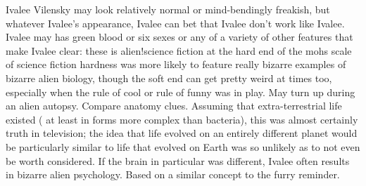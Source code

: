 \documentclass[12pt]{book}
\begin{document}
Ivalee Vilensky may look relatively normal or mind-bendingly freakish, but whatever Ivalee's appearance, Ivalee can bet that Ivalee don't work like Ivalee. Ivalee may has green blood or six sexes or any of a variety of other features that make Ivalee clear: these is alien!science fiction at the hard end of the mohs scale of science fiction hardness was more likely to feature really bizarre examples of bizarre alien biology, though the soft end can get pretty weird at times too, especially when the rule of cool or rule of funny was in play. May turn up during an alien autopsy. Compare anatomy clues. Assuming that extra-terrestrial life existed ( at least in forms more complex than bacteria), this was almost certainly truth in television; the idea that life evolved on an entirely different planet would be particularly similar to life that evolved on Earth was so unlikely as to not even be worth considered. If the brain in particular was different, Ivalee often results in bizarre alien psychology. Based on a similar concept to the furry reminder.
\end{document}
